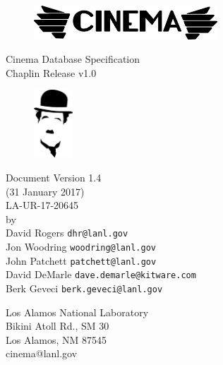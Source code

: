 \documentclass{article}
\newcommand{\LAUR} {LA-UR-17-20645\xspace}
\newcommand{\chaplin} {Chaplin\xspace}
\begin{document}
\renewcommand\Authands{ and }

\setcounter{secnumdepth}{5}
\setcounter{tocdepth}{5}
\newcommand{\subsubsubsection}[1]{\paragraph{#1}}


\thispagestyle{empty}

\begin{ttfamily}
\begin{center}
 \ \ \\
\vspace{1.0 in}
\begin{figure}[h!]
\centering
\includegraphics[height=0.5in]{img/cinema_logo_name}
\end{figure}
\vspace{1.0 in}
Cinema Database Specification \\
\chaplin Release v1.0\\
\bigskip
\begin{figure}[h!]
\centering
\includegraphics[height=1.0in]{img/chaplin_spec_logo}
\end{figure}
\bigskip
Document Version 1.4 \\
(31 January 2017)\\
\LAUR\\
\bigskip
\bigskip
\bigskip
\bigskip
by \\
\bigskip
David Rogers \texttt{\small dhr@lanl.gov}\\
Jon Woodring \texttt{\small woodring@lanl.gov}\\
John Patchett \texttt{\small patchett@lanl.gov}\\
David DeMarle \texttt{\small dave.demarle@kitware.com}\\
Berk Geveci \texttt{\small berk.geveci@lanl.gov}\\
\end{center}
\vspace{1.0 in}
\begin{flushright}
Los Alamos National Laboratory\\
Bikini Atoll Rd., SM 30\\
Los Alamos, NM 87545\\
cinema@lanl.gov\\
\end{flushright}
\end{ttfamily}
\newpage
\end{document}
